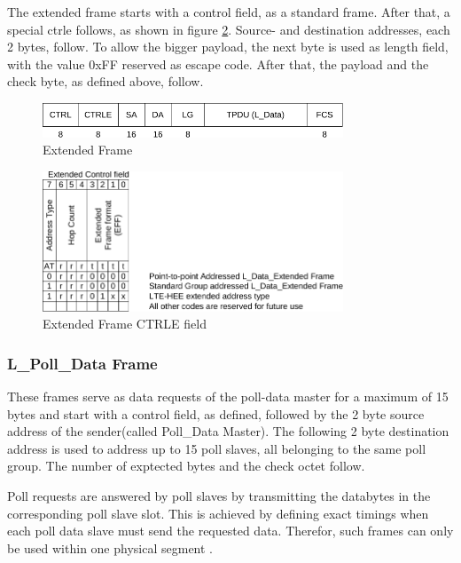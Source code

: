 The extended frame starts with a control field, as a standard frame. After that, a special \gls{ctrle} follows, as shown in figure \ref{fig:ctrle}.
Source- and destination addresses, each 2 bytes, follow. To allow the bigger payload, the next byte is used as length field, with the value 0xFF reserved
as escape code. After that, the payload and the check byte, as defined above, follow.

\begin{figure}
    \centering
    \includegraphics[width=0.8\textwidth]{figures/extendedframe}
    \caption{Extended Frame}
    \label{fig:extframe}
\end{figure}

\begin{figure}
    \centering
    \includegraphics[width=0.8\textwidth]{figures/CTRLE}
    \caption{Extended Frame CTRLE field}
    \label{fig:ctrle}
\end{figure}

\subsubsection{L\_Poll\_Data Frame}

These frames serve as data requests of the poll-data master for a maximum of 15 bytes
and start with a control field, as defined, followed by the 2 byte source address
of the sender(called Poll\_Data Master). The following 2 byte destination address is 
used to address up to 15 poll slaves, all belonging to the same poll group. The number of
exptected bytes and the check octet follow.

Poll requests are answered by poll slaves by transmitting the databytes in the corresponding poll slave slot.
This is achieved by defining exact timings when each poll data slave must send the requested data. Therefor, such frames can only be used within
one physical segment \cite{knxTP1}.

